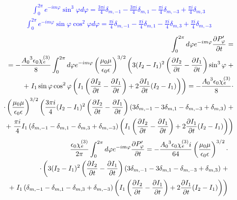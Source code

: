 %
\textcolor{blue} { \begin{equation*} \begin{aligned}
\int_{0}^{2\pi} e^{-i m \varphi} \sin^3 \varphi d \varphi = 
\frac{3 \pi i}{4} \delta_{m,-1} - \frac{3 \pi i}{4} \delta_{m,1} - 
\frac{\pi i}{4} \delta_{m,-3} + \frac{\pi i}{4} \delta_{m,3}
\end{aligned} \end{equation*} }
%
\textcolor{blue} { \begin{equation*} \begin{aligned}
\int_0^{2\pi} e^{-i m \varphi} \sin \varphi \cos^2 \varphi d \varphi = 
\frac{\pi i }{4} \delta_{m,-1} - \frac{\pi i }{4} \delta_{m,1} -
\frac{\pi i }{4} \delta_{m,3} + \frac{\pi i }{4} \delta_{m,-3}
\end{aligned} \end{equation*} }
%
\textcolor{blue} { \begin{equation*} \begin{aligned}
\int_{0}^{2 \pi} d \varphi e^{-im \varphi} \frac{\partial P_\varphi^\prime}{\partial t} = \\
= - \frac{ {A_0}^3 \epsilon_0 \chi_e^{(3)} }{ 8 } 
\int_{0}^{2 \pi} d \varphi e^{-im \varphi}
\left( \frac{\mu_0 \mu} {\epsilon_0 \epsilon} \right)^{3/2} \left(
3 ( I_2 - I_1 )^2 \left( \frac{\partial I_2}{\partial t} - \frac{\partial I_1}{\partial t} \right)
\sin^3 \varphi \right. + \\
+ \left. I_1 \sin \varphi \cos^2 \varphi \left( 
I_1 \left( \frac{\partial I_2}{\partial t} - \frac{\partial I_1}{\partial t} \right) + 
2 \frac{\partial I_1}{\partial t} (I_2 - I_1) \right) \right) = 
- \frac{ {A_0}^3 \epsilon_0 \chi_e^{(3)} }{ 8 } \cdot \\ 
\cdot \left( \frac{\mu_0 \mu} {\epsilon_0 \epsilon} \right)^{3/2} \left(
\frac{3 \pi i}{4} ( I_2 - I_1 )^2 \left( \frac{\partial I_2}{\partial t} - 
\frac{\partial I_1}{\partial t} \right) \left( 3 \delta_{m,-1} - 3 \delta_{m,1} - 
\delta_{m,-3} + \delta_{m,3} \right) \right. + \\
+ \left. \frac{\pi i}{4} I_1 \left( \delta_{m,-1} - \delta_{m,1} - 
\delta_{m,3} + \delta_{m,-3} \right) \left( 
I_1 \left( \frac{\partial I_2}{\partial t} - \frac{\partial I_1}{\partial t} \right) + 
2 \frac{\partial I_1}{\partial t} (I_2 - I_1) \right) \right)
\end{aligned} \end{equation*} }
%
\begin{equation*} \begin{aligned}
\frac{\epsilon_0 \chi_e^{(3)}}{2 \pi} \int_{0}^{2 \pi} d \varphi 
e^{-im \varphi} \frac{\partial P_\varphi^\prime}{\partial t} = 
- \frac{ {A_0}^3 \epsilon_0 \chi_e^{(3)}  i}{ 64 }
\left( \frac{\mu_0 \mu} {\epsilon_0 \epsilon} \right)^{3/2} \cdot \\ 
\cdot \left( 3 ( I_2 - I_1 )^2 \left( \frac{\partial I_2}{\partial t} - 
\frac{\partial I_1}{\partial t} \right) \left( 3 \delta_{m,-1} - 3 \delta_{m,1} - 
\delta_{m,-3} + \delta_{m,3} \right) \right. + \\
+ \left. I_1 \left( \delta_{m,-1} - \delta_{m,1} - 
\delta_{m,3} + \delta_{m,-3} \right) \left( 
I_1 \left( \frac{\partial I_2}{\partial t} - \frac{\partial I_1}{\partial t} \right) + 
2 \frac{\partial I_1}{\partial t} (I_2 - I_1) \right) \right)
\end{aligned} \end{equation*}

